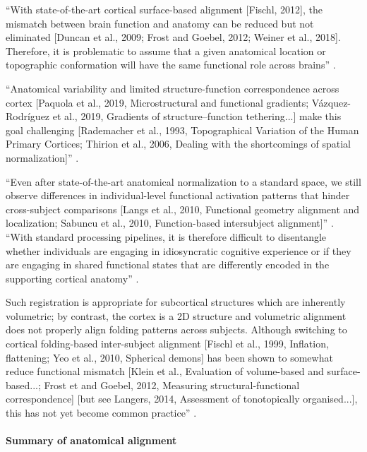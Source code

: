 %
``With state-of-the-art cortical surface-based alignment [Fischl, 2012], the
mismatch between brain function and anatomy can be reduced but not eliminated
[Duncan et al., 2009; Frost and Goebel, 2012; Weiner et al., 2018]. Therefore,
it is problematic to assume that a given anatomical location or topographic
conformation will have the same functional role across brains''
\citep{feilong2018reliable}.

%
``Anatomical variability and limited structure-function correspondence across
cortex [Paquola et al., 2019, Microstructural and functional gradients;
Vázquez-Rodríguez et al., 2019, Gradients of structure–function tethering...]
make this goal challenging [Rademacher et al., 1993, Topographical Variation of
the Human Primary Cortices; Thirion et al., 2006, Dealing with the shortcomings
of spatial normalization]'' \citep{bazeille2021empirical}.

%
``Even after state-of-the-art anatomical normalization to a standard space, we
still observe differences in individual-level functional activation patterns
that hinder cross-subject comparisons [Langs et al., 2010, Functional geometry
alignment and localization; Sabuncu et al., 2010, Function-based intersubject
alignment]'' \citep{bazeille2021empirical}.
%
``With standard processing pipelines, it is therefore difficult to disentangle
whether individuals are engaging in idiosyncratic cognitive experience or if
they are engaging in shared functional states that are differently encoded in
the supporting cortical anatomy'' \citep{bazeille2021empirical}.

%
Such registration is appropriate for subcortical structures which are inherently
volumetric; by contrast, the cortex is a 2D structure and volumetric alignment
does not properly align folding patterns across subjects. Although switching to
cortical folding-based inter-subject alignment [Fischl et al., 1999, Inflation,
flattening; Yeo et al., 2010, Spherical demons] has been shown to somewhat
reduce functional mismatch [Klein et al., Evaluation of volume-based and
surface-based...; Frost et and Goebel, 2012, Measuring structural-functional
correspondence] [but see Langers, 2014, Assessment of tonotopically
organised...], this has not yet become common practice''
\citep{dubois2016building}.


\paragraph{Summary of anatomical alignment}


